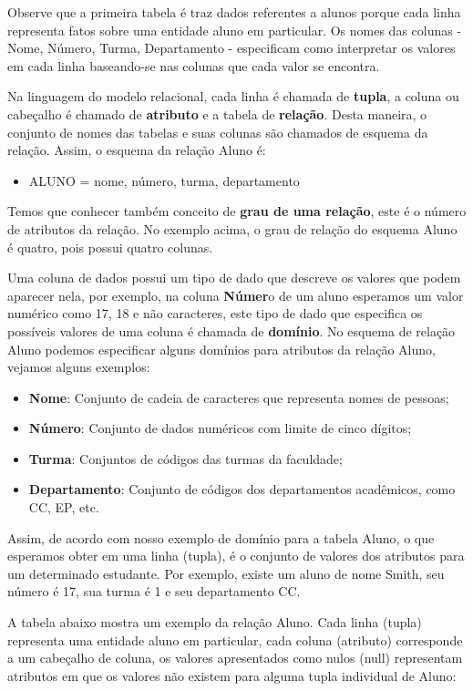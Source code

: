 \documentclass{article}
\begin{document}
Observe que a primeira tabela é traz dados referentes a alunos porque cada linha representa fatos sobre uma entidade aluno em particular. Os nomes das colunas - Nome, Número, Turma, Departamento - especificam como interpretar os valores em cada linha baseando-se nas colunas que cada valor se encontra.

Na linguagem do modelo relacional, cada linha é chamada de \textbf{tupla}, a coluna ou cabeçalho é chamado de \textbf{atributo} e a tabela de \textbf{relação}. Desta maneira, o conjunto de nomes das tabelas e suas colunas são chamados de esquema da relação. Assim, o esquema da relação Aluno é:
\begin{itemize}
    \item ALUNO = {nome, número, turma, departamento}
\end{itemize}
Temos que conhecer também conceito de \textbf{grau de uma relação}, este é o número de atributos da relação. No exemplo acima, o grau de relação do esquema Aluno é quatro, pois possui quatro colunas.

Uma coluna de dados possui um tipo de dado que descreve os valores que podem aparecer nela, por exemplo, na coluna \textbf{Númer}o de um aluno esperamos um valor numérico como 17, 18 e não caracteres, este tipo de dado que especifica os possíveis valores de uma coluna é chamada de \textbf{domínio}.
No esquema de relação Aluno podemos especificar alguns domínios para atributos da relação Aluno, vejamos alguns exemplos:
\begin{itemize}
    \item \textbf{Nome}: Conjunto de cadeia de caracteres que representa nomes de pessoas;
    \item \textbf{Número}: Conjunto de dados numéricos com limite de cinco dígitos;
    \item \textbf{Turma}: Conjuntos de códigos das turmas da faculdade;
    \item \textbf{Departamento}: Conjunto de códigos dos departamentos acadêmicos, como CC, EP, etc.
\end{itemize}
Assim, de acordo com nosso exemplo de domínio para a tabela Aluno, o que esperamos obter em uma linha (tupla), é o conjunto de valores dos atributos para um determinado estudante. Por exemplo, existe um aluno de nome Smith, seu número é 17, sua turma é 1 e seu departamento CC.

A tabela abaixo mostra um exemplo da relação Aluno. Cada linha (tupla) representa uma entidade aluno em particular, cada coluna (atributo) corresponde a um cabeçalho de coluna, os valores apresentados como nulos (null) representam atributos em que os valores não existem para alguma tupla individual de Aluno:
\end{document}
